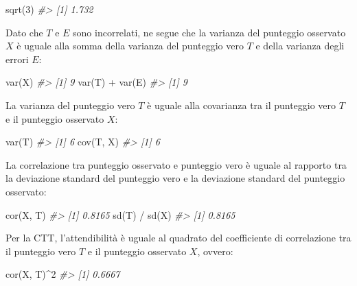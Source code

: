 \documentclass[
  11pt,
]{krantz}
\makeatletter
\newenvironment{Shaded}{\begin{snugshade}}{\end{snugshade}}
\newcommand{\CommentTok}[1]{\textcolor[rgb]{0.37,0.37,0.37}{\textit{#1}}}
\newcommand{\DecValTok}[1]{\textcolor[rgb]{0.06,0.06,0.06}{#1}}
\newcommand{\FunctionTok}[1]{\textcolor[rgb]{0,0,0}{#1}}
\newcommand{\NormalTok}[1]{#1}
\newcommand{\SpecialCharTok}[1]{\textcolor[rgb]{0,0,0}{#1}}
\newenvironment{kframe}{%
\medskip{}
\setlength{\fboxsep}{.8em}
 \def\at@end@of@kframe{}%
 \ifinner\ifhmode%
  \def\at@end@of@kframe{\end{minipage}}%
  \begin{minipage}{\columnwidth}%
 \fi\fi%
 \def\FrameCommand##1{\hskip\@totalleftmargin \hskip-\fboxsep
 \colorbox{shadecolor}{##1}\hskip-\fboxsep
     \hskip-\linewidth \hskip-\@totalleftmargin \hskip\columnwidth}%
 \MakeFramed {\advance\hsize-\width
   \@totalleftmargin\z@ \linewidth\hsize
   \@setminipage}}%
 {\par\unskip\endMakeFramed%
 \at@end@of@kframe}
\renewenvironment{Shaded}{\begin{kframe}}{\end{kframe}}
\theoremstyle{definition}
\theoremstyle{definition}
\theoremstyle{definition}
\theoremstyle{definition}
\theoremstyle{remark}
\makeatother
\begin{document}
\begin{Shaded}
\begin{Highlighting}[]
\FunctionTok{sqrt}\NormalTok{(}\DecValTok{3}\NormalTok{)}
\CommentTok{\#\textgreater{} [1] 1.732}
\end{Highlighting}
\end{Shaded}

Dato che \(T\) e \(E\) sono incorrelati, ne segue che la varianza del punteggio osservato \(X\) è uguale alla somma della varianza del punteggio vero \(T\) e della varianza degli errori \(E\):

\begin{Shaded}
\begin{Highlighting}[]
\FunctionTok{var}\NormalTok{(X)}
\CommentTok{\#\textgreater{} [1] 9}
\FunctionTok{var}\NormalTok{(T) }\SpecialCharTok{+} \FunctionTok{var}\NormalTok{(E)}
\CommentTok{\#\textgreater{} [1] 9}
\end{Highlighting}
\end{Shaded}

La varianza del punteggio vero \(T\) è uguale alla covarianza tra il punteggio vero \(T\) e il punteggio osservato \(X\):

\begin{Shaded}
\begin{Highlighting}[]
\FunctionTok{var}\NormalTok{(T)}
\CommentTok{\#\textgreater{} [1] 6}
\FunctionTok{cov}\NormalTok{(T, X)}
\CommentTok{\#\textgreater{} [1] 6}
\end{Highlighting}
\end{Shaded}

La correlazione tra punteggio osservato e punteggio vero è uguale al rapporto tra la deviazione standard del punteggio vero e la deviazione standard del punteggio osservato:

\begin{Shaded}
\begin{Highlighting}[]
\FunctionTok{cor}\NormalTok{(X, T)}
\CommentTok{\#\textgreater{} [1] 0.8165}
\FunctionTok{sd}\NormalTok{(T) }\SpecialCharTok{/} \FunctionTok{sd}\NormalTok{(X)}
\CommentTok{\#\textgreater{} [1] 0.8165}
\end{Highlighting}
\end{Shaded}

Per la CTT, l'attendibilità è uguale al quadrato del coefficiente di correlazione tra il punteggio vero \(T\) e il punteggio osservato \(X\), ovvero:

\begin{Shaded}
\begin{Highlighting}[]
\FunctionTok{cor}\NormalTok{(X, T)}\SpecialCharTok{\^{}}\DecValTok{2}
\CommentTok{\#\textgreater{} [1] 0.6667}
\end{Highlighting}
\end{Shaded}
\end{document}
